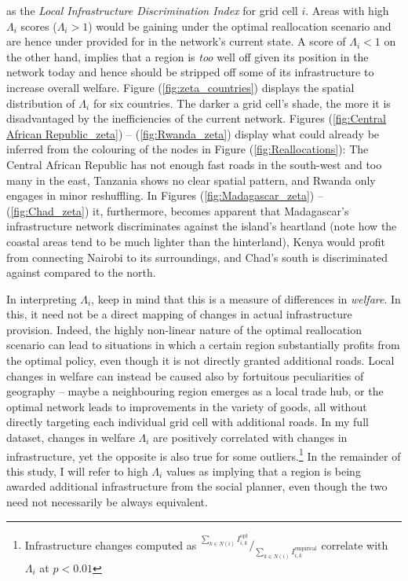 \documentclass[11pt, oneside]{article}   	%
\let\oldref\ref
\renewcommand{\ref}[1]{(\oldref{#1})}
\begin{document}
as the \emph{Local Infrastructure Discrimination Index} for grid cell $i$. Areas with high $\Lambda_{i}$ scores ($\Lambda_{i} > 1$) would be gaining under the optimal reallocation scenario and are hence under provided for in the network's current state. A score of $\Lambda_{i} < 1$ on the other hand, implies that a region is \emph{too} well off given its position in the network today and hence should be stripped off some of its infrastructure to increase overall welfare. Figure \ref{fig:zeta_countries} displays the spatial distribution of $\Lambda_{i}$ for six countries. The darker a grid cell's shade, the more it is disadvantaged by the inefficiencies of the current network. Figures \ref{fig:Central African Republic_zeta} -- \ref{fig:Rwanda_zeta} display what could already be inferred from the colouring of the nodes in Figure \ref{fig:Reallocations}: The Central African Republic has not enough fast roads in the south-west and too many in the east, Tanzania shows no clear spatial pattern, and Rwanda only engages in minor reshuffling. In Figures \ref{fig:Madagascar_zeta} -- \ref{fig:Chad_zeta} it, furthermore, becomes apparent that Madagascar's infrastructure network discriminates against the island's heartland (note how the coastal areas tend to be much lighter than the hinterland), Kenya would profit from connecting Nairobi to its surroundings, and Chad's south is discriminated against compared to the north.

In interpreting $\Lambda_{i}$, keep in mind that this is a measure of differences in \emph{welfare}. In this, it need not be a direct mapping of changes in actual infrastructure provision. Indeed, the highly non-linear nature of the optimal reallocation scenario can lead to situations in which a certain region substantially profits from the optimal policy, even though it is not directly granted additional roads. Local changes in welfare can instead be caused also by fortuitous peculiarities of geography -- maybe a neighbouring region emerges as a local trade hub, or the optimal network leads to improvements in the variety of goods, all without directly targeting each individual grid cell with additional roads. In my full dataset, changes in welfare $\Lambda_{i}$ are positively correlated with changes in infrastructure, yet the opposite is also true for some outliers.\footnote{Infrastructure changes computed as $^{\sum_{k \in N(i)}^{}I_{i,k}^{\textrm{opt}}} / _{\sum_{k \in N(i)}^{}I_{i,k}^{\textrm{empirical}}}$ correlate with $\Lambda_{i}$ at $p < 0.01$} In the remainder of this study, I will refer to high $\Lambda_{i}$ values as implying that a region is being awarded additional infrastructure from the social planner, even though the two need not necessarily be always equivalent.
\end{document}
